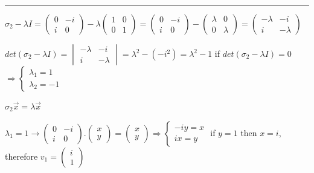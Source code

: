\documentclass[fleqn]{article}
\begin{document}
\begin{enumerate}
      \textcolor{hwColor}{
        \rule{16cm}{0.4pt}
      }

      \textcolor{hwColor}{ 
        $\sigma_2-\lambda I=
          \begin{pmatrix}
            0 & -i \\
            i & 0 
          \end{pmatrix}-
          \lambda \begin{pmatrix}
            1 & 0 \\
            0 & 1
          \end{pmatrix}=
          \begin{pmatrix}
            0 & -i \\
            i & 0 
          \end{pmatrix}-
          \begin{pmatrix}
            \lambda & 0 \\
            0 & \lambda
          \end{pmatrix}=
          \begin{pmatrix}
            -\lambda & -i \\
            i & -\lambda 
          \end{pmatrix}
        $
      }

      \textcolor{hwColor}{ 
        $det(\sigma_2-\lambda I)=
          \begin{vmatrix}
            -\lambda & -i \\
            i & -\lambda
          \end{vmatrix}= \lambda^2-(-i^2)=\lambda^2-1
        $
        if $det(\sigma_2-\lambda I)=0$ 
        $
          \Longrightarrow
          \begin{cases}
            \lambda_1=1 \\
            \lambda_2=-1
          \end{cases}
        $
      }

      \textcolor{hwColor}{ $\sigma_2 \overrightarrow{x}=\lambda \overrightarrow{x}$ }

      \textcolor{hwColor}{ 
        $
        \lambda_1=1  \rightarrow 
        \begin{pmatrix}
         0 & -i \\
         i & 0  
        \end{pmatrix}.\begin{pmatrix}
          x \\
          y
        \end{pmatrix}=\begin{pmatrix}
          x \\
          y
        \end{pmatrix}
        \Longrightarrow 
        \begin{cases}
          -iy=x \\
          ix=y
        \end{cases}
        $
        if $y=1$ then $x=i$, therefore $v_1=\begin{pmatrix}
          i \\
          1
        \end{pmatrix}$
       }


\end{enumerate}
\end{document}
